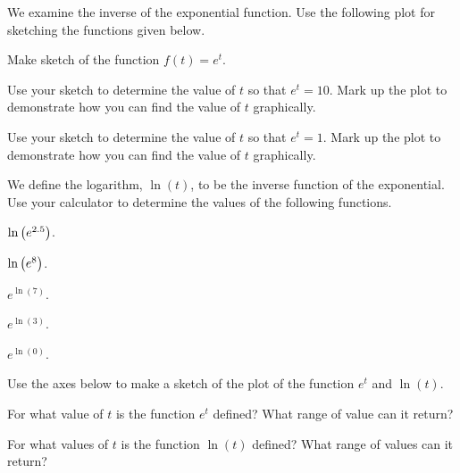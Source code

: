 \begin{problem}
\item We examine the inverse of the exponential function. Use the
  following plot for sketching the functions given below.

  \scalebox{0.75}{}

  \begin{subproblem}
  \item Make sketch of the function $f(t) = e^t$.
  \item Use your sketch to determine the value of $t$ so that
    $e^t=10$. Mark up the plot to demonstrate how you can find the
    value of $t$ graphically.
  \item Use your sketch to determine the value of $t$ so that
    $e^t=1$. Mark up the plot to demonstrate how you can find the
    value of $t$ graphically.
  \end{subproblem}

  \clearpage

\item We define the logarithm, $\ln(t)$, to be the inverse function of
  the exponential.  Use your calculator to determine the values of the
  following functions.
  \begin{subproblem}
  \item $\ln\left( e^{2.5} \right)$.
    \vfill
  \item $\ln\left( e^{8} \right)$.
    \vfill
  \item $e^{\ln(7)}$.
    \vfill
  \item $e^{\ln(3)}$.
    \vfill
  \item $e^{\ln(0)}$.
    \vfill
  \end{subproblem}

  \clearpage

\item Use the axes below to make a sketch of the plot of the function
  $e^t$ and $\ln(t)$.

  \scalebox{0.75}{}

  \clearpage

\item For what value of $t$ is the function $e^t$ defined? What range
  of value can it return?

  \vfill

\item For what values of $t$ is the function $\ln(t)$ defined? What
  range of values can it return?

  \vfill

\end{problem}


